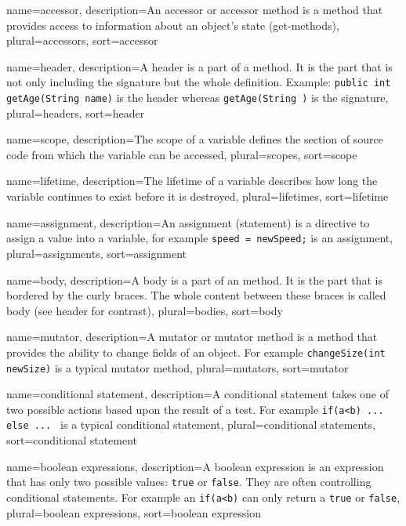 {
	name=accessor,
	description={An accessor or accessor method is a method that provides
		access to information about an object's state (get-methods)},
	plural=accessors,
	sort=accessor
}

{
	name=header,
	description={A header is a part of a method. It is the part that is
		not only including the signature but the whole definition.
		Example: \lstinline{public int getAge(String name)} is the
		header whereas \lstinline{getAge(String )} is the signature},
	plural=headers,
	sort=header
}

{
	name=scope,
	description={The scope of a variable defines the section of source
		code from which the variable can be accessed},
	plural=scopes,
	sort=scope
}

{
	name=lifetime,
	description={The lifetime of a variable describes how long the
		variable continues to exist before it is destroyed},
	plural=lifetimes,
	sort=lifetime
}

{
	name=assignment,
	description={An assignment (statement) is a directive to assign a
		value into a variable, for example 
		\lstinline{speed = newSpeed;} is an assignment},
	plural=assignments,
	sort=assignment
}

{
	name=body,
	description={A body is a part of an method. It is the part that is
		bordered by the curly braces. The whole content between these
		braces is called body (see header for contrast)},
	plural=bodies,
	sort=body
}

{
	name=mutator,
	description={A mutator or mutator method is a method that provides
		the ability to change fields of an object. For example
		\lstinline?changeSize(int newSize)? is a typical mutator
		method},
	plural=mutators,
	sort=mutator
}

{
	name=conditional statement,
	description={A conditional statement takes one of two possible actions
		based upon the result of a test. For example 
		\lstinline?if(a<b) ... else ... ? is a typical conditional 
		statement},
	plural=conditional statements,
	sort=conditional statement
}

{
	name=boolean expressions,
	description={A boolean expression is an expression that has only two
		possible values: \lstinline?true? or \lstinline?false?.
		They are often controlling conditional statements. For example
		an \lstinline?if(a<b)? can only return a \lstinline?true? or
		\lstinline?false?},
	plural=boolean expressions,
	sort=boolean expression
}

